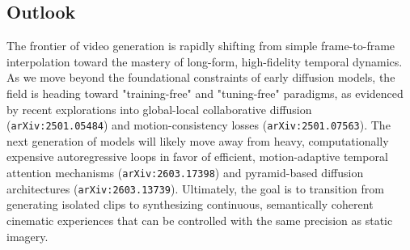 \documentclass[11pt]{article}
\begin{document}
\subsection{Outlook}

The frontier of video generation is rapidly shifting from simple frame-to-frame interpolation toward the mastery of long-form, high-fidelity temporal dynamics. As we move beyond the foundational constraints of early diffusion models, the field is heading toward "training-free" and "tuning-free" paradigms, as evidenced by recent explorations into global-local collaborative diffusion (\texttt{arXiv:2501.05484}) and motion-consistency losses (\texttt{arXiv:2501.07563}). The next generation of models will likely move away from heavy, computationally expensive autoregressive loops in favor of efficient, motion-adaptive temporal attention mechanisms (\texttt{arXiv:2603.17398}) and pyramid-based diffusion architectures (\texttt{arXiv:2603.13739}). Ultimately, the goal is to transition from generating isolated clips to synthesizing continuous, semantically coherent cinematic experiences that can be controlled with the same precision as static imagery.
\end{document}
